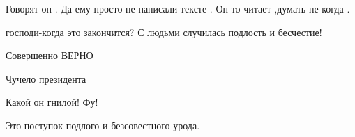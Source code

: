 \begin{itemize}
 
Говорят он .
Да ему просто не написали тексте .
Он то читает ,думать не когда .

 
господи-когда это закончится? С людьми случилась подлость и бесчестие!

 
Совершенно ВЕРНО

 
Чучело президента

 
Какой он гнилой! Фу!

 
Это поступок подлого и безсовестного урода.

 


\end{itemize}
